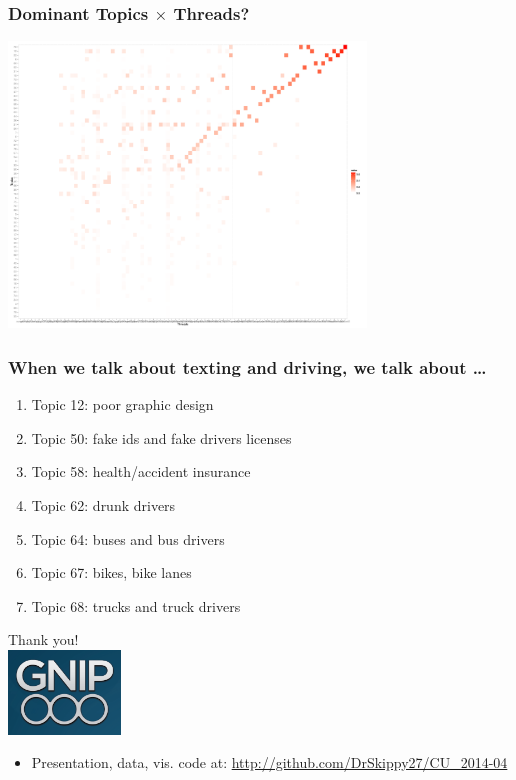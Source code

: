 \documentclass{beamer}
\begin{document}
\begin{frame}\frametitle{Dominant Topics $\times$ Threads?}
  \begin{center}
    \includegraphics[width=9.5cm]{./imgs/gg_heat.pdf}
  \end{center}
\end{frame}

\begin{frame}\frametitle{When we talk about texting and driving, we talk about \ldots}
\begin{center}
{\Large 
\begin{enumerate}
\item Topic 12: poor graphic design
\item Topic 50: fake ids and fake drivers licenses
\item Topic 58: health/accident insurance
\item Topic 62: drunk drivers
\item Topic 64: buses and bus drivers
\item Topic 67: bikes, bike lanes
\item Topic 68: trucks and truck drivers
\end{enumerate}
}
\end{center}
\end{frame}




\begin{frame}
  \begin{center}
    {\Large Thank you!}  \\ [20pt]
    \includegraphics[width=3cm]{./imgs/logo.png} \\ [15pt]
    \begin{itemize}
    \item Presentation, data, vis. code at: \url{http://github.com/DrSkippy27/CU_2014-04}
    \end{itemize}
  \end{center}
\end{frame}
\end{document}
